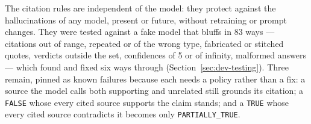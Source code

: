 The citation rules are independent of the model: they protect against
the hallucinations of any model, present or future, without retraining
or prompt changes. They were tested against a fake model that bluffs
in 83 ways --- citations out of range, repeated or of the wrong type,
fabricated or stitched quotes, verdicts outside the set, confidences of
5 or of infinity, malformed answers --- which found and fixed six ways
through (Section~\ref{sec:dev-testing}). Three remain, pinned as known
failures because each needs a policy rather than a fix: a source the
model calls both supporting and unrelated still grounds its citation; a
\texttt{FALSE} whose every cited source supports the claim stands; and
a \texttt{TRUE} whose every cited source contradicts it becomes only
\texttt{PARTIALLY\_TRUE}.
